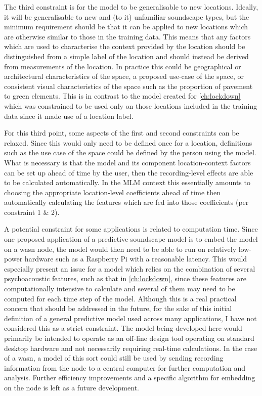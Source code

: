The third constraint is for the model to be generalisable to new locations. Ideally, it will be generalisable to new and (to it) unfamiliar soundscape types, but the minimum requirement should be that it can be applied to new locations which are otherwise similar to those in the training data. This means that any factors which are used to characterise the context provided by the location should be distinguished from a simple label of the location and should instead be derived from measurements of the location. In practice this could be geographical or architectural characteristics of the space, a proposed use-case of the space, or consistent visual characteristics of the space such as the proportion of pavement to green elements. This is in contrast to the model created for \cref{ch:lockdown} which was constrained to be used only on those locations included in the training data since it made use of a location label.

For this third point, some aspects of the first and second constraints can be relaxed. Since this would only need to be defined once for a location, definitions such as the use case of the space could be defined by the person using the model. What is necessary is that the model and its component location-context factors can be set up ahead of time by the user, then the recording-level effects are able to be calculated automatically. In the MLM context this essentially amounts to choosing the appropriate location-level coefficients ahead of time then automatically calculating the features which are fed into those coefficients (per constraint 1 \& 2).

A potential constraint for some applications is related to computation time. Since one proposed application of a predictive soundscape model is to embed the model on a \gls{wasn} node, the model would then need to be able to run on relatively low-power hardware such as a Raspberry Pi with a reasonable latency. This would especially present an issue for a model which relies on the combination of several psychoacoustic features, such as that in \cref{ch:lockdown}, since these features are computationally intensive to calculate and several of them may need to be computed for each time step of the model. Although this is a real practical concern that should be addressed in the future, for the sake of this initial definition of a general predictive model used across many applications, I have not considered this as a strict constraint. The model being developed here would primarily be intended to operate as an off-line design tool operating on standard desktop hardware and not necessarily requiring real-time calculations. In the case of a \gls{wasn}, a model of this sort could still be used by sending recording information from the node to a central computer for further computation and analysis. Further efficiency improvements and a specific algorithm for embedding on the node is left as a future development.

